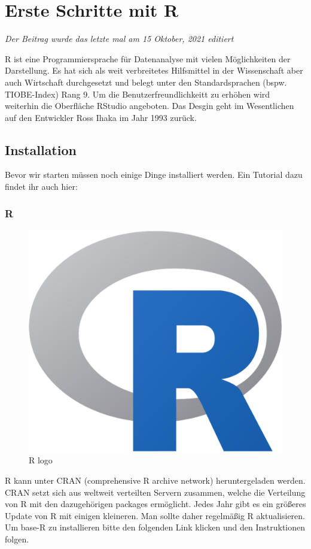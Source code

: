 \documentclass[
]{article}
\begin{document}
\hypertarget{erste-schritte-mit-r}{%
\section{Erste Schritte mit R}\label{erste-schritte-mit-r}}

\emph{Der Beitrag wurde das letzte mal am 15 Oktober, 2021 editiert}

R ist eine Programmiersprache für Datenanalyse mit vielen Möglichkeiten der Darstellung. Es hat sich als weit verbreitetes Hilfsmittel in der Wissenschaft aber auch Wirtschaft durchgesetzt und belegt unter den Standardsprachen (bspw. TIOBE-Index) Rang 9. Um die Benutzerfreundlichkeitt zu erhöhen wird weiterhin die Oberfläche RStudio angeboten. Das Desgin geht im Wesentlichen auf den Entwickler Ross Ihaka im Jahr 1993 zurück.

\hypertarget{installation}{%
\subsection{Installation}\label{installation}}

Bevor wir starten müssen noch einige Dinge installiert werden. Ein Tutorial dazu findet ihr auch hier:

\hypertarget{r}{%
\subsubsection{R}\label{r}}

\begin{figure}

{\centering \includegraphics[width=0.5\linewidth]{images/004} 

}

\caption{R logo}\label{fig:unnamed-chunk-8}
\end{figure}

R kann unter CRAN (comprehensive R archive network) heruntergeladen werden. CRAN setzt sich aus weltweit verteilten Servern zusammen, welche die Verteilung von R mit den dazugehörigen packages ermöglicht. Jedes Jahr gibt es ein größeres Update von R mit einigen kleineren. Man sollte daher regelmäßig R aktualisieren. Um base-R zu installieren bitte den folgenden Link klicken und den Instruktionen folgen.
\end{document}
